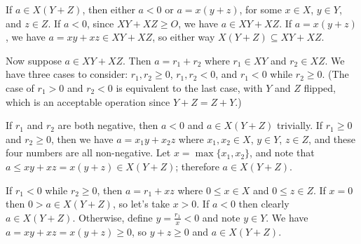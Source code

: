\begin{solution}
{\item If \(a \in X(Y+Z)\), then either \(a < 0\) or \(a = x(y+z)\), for some \(x \in X\), \(y \in Y\), and \(z \in Z\). If \(a < 0\), since \(XY + XZ \geq O\), we have \(a \in XY + XZ\). If \(a = x(y+z)\), we have \(a = xy + xz \in XY + XZ\), so either way \(X(Y+Z) \subseteq XY + XZ\).

Now suppose \(a \in XY + XZ\). Then \(a = r_1 + r_2\) where \(r_1 \in XY\) and \(r_2 \in XZ\). We have three cases to consider: \(r_1,r_2 \geq 0\), \(r_1,r_2 < 0\), and \(r_1 < 0\) while \(r_2 \geq 0\). (The case of \(r_1 > 0\) and \(r_2 < 0\) is equivalent to the last case, with \(Y\) and \(Z\) flipped, which is an acceptable operation since \(Y+Z = Z+Y\).)

If \(r_1\) and \(r_2\) are both negative, then \(a < 0\) and \(a \in X(Y+Z)\) trivially. If \(r_1 \geq 0\) and \(r_2 \geq 0\), then we have \(a =x_1 y + x_2 z\) where \(x_1, x_2 \in X\), \(y\in Y\), \(z \in Z\), and these four numbers are all non-negative. Let \(x = \max\{x_1, x_2\}\), and note that \(a \leq xy + xz = x(y+z) \in X(Y+Z)\); therefore \(a \in X(Y+Z)\).

If \(r_1 < 0\) while \(r_2 \geq 0\), then \(a = r_1 + xz\) where \(0 \leq x \in X\) and \(0 \leq z \in Z\). If \(x = 0\)  then \(0 > a \in X(Y+Z)\), so let's take \(x > 0\).
If \(a < 0\) then clearly \(a \in X(Y+Z)\). Otherwise, define \(y = \frac{r_1}{x} < 0 \) and note \(y \in Y\). We have \(a = xy + xz = x(y+z) \geq 0\), so \(y+z \geq 0\) and \(a \in X(Y+Z)\).
}
\end{solution}
